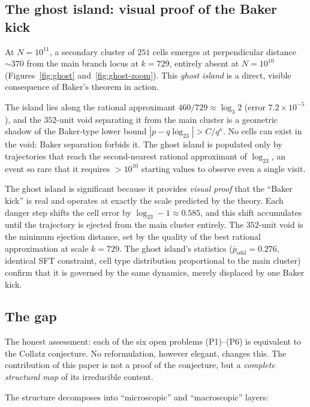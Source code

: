 \documentclass{CUP-JNL-FMP}%
\theoremstyle{definition}
\numberwithin{equation}{section}
\newcommand{\logb}{\log_2}
\begin{document}
\subsection{The ghost island: visual proof of the Baker kick}

At $N = 10^{11}$, a secondary cluster of $251$ cells emerges at perpendicular
distance ${\sim}370$ from the main branch locus at $k = 729$, entirely absent
at $N = 10^{10}$ (Figures~\ref{fig:ghost} and~\ref{fig:ghost-zoom}). This
\emph{ghost island} is a direct, visible consequence of Baker's theorem in action.

The island lies along the rational approximant $460/729 \approx \log_3 2$
(error $7.2 \times 10^{-5}$), and the $352$-unit void separating it from the
main cluster is a geometric shadow of the Baker-type lower bound
$|p - q \logb 3| > C/q^{\kappa}$. No cells can exist in the void: Baker
separation forbids it. The ghost island is populated only by trajectories that
reach the second-nearest rational approximant of $\logb 3$, an event so rare
that it requires $> 10^{10}$ starting values to observe even a single visit.

The ghost island is significant because it provides \emph{visual proof} that
the ``Baker kick'' is real and operates at exactly the scale predicted by the
theory. Each danger step shifts the cell error by $\logb 3 - 1 \approx 0.585$,
and this shift accumulates until the trajectory is ejected from the main cluster
entirely. The $352$-unit void is the minimum ejection distance, set by the
quality of the best rational approximation at scale $k = 729$. The ghost island's
statistics ($\bar{p}_{\text{odd}} = 0.276$, identical SFT constraint, cell type
distribution proportional to the main cluster) confirm that it is governed by the
same dynamics, merely displaced by one Baker kick.

\subsection{The gap}

The honest assessment: each of the six open problems (P1)--(P6) is equivalent
to the Collatz conjecture. No reformulation, however elegant, changes this.
The contribution of this paper is not a proof of the conjecture, but a
\emph{complete structural map} of its irreducible content.

The structure decomposes into ``microscopic'' and ``macroscopic'' layers:
\end{document}
